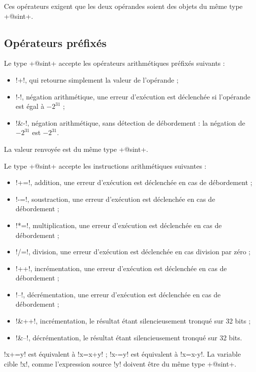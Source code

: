Ces opérateurs exigent que les deux opérandes soient des objets du même type \ggs+@sint+. 

\subsection{Opérateurs préfixés}
Le type \ggs+@sint+ accepte les opérateurs arithmétiques préfixés suivants :
\begin{itemize}
  \item \ggs!+!, qui retourne simplement la valeur de l'opérande ;
  \item \ggs!-!, négation arithmétique, une erreur d'exécution est déclenchée si l'opérande est égal à $-2^{31}$ ;
  \item \ggs!&-!, négation arithmétique, sans détection de débordement : la négation de $-2^{31}$ est $-2^{31}$.
\end{itemize}

La valeur renvoyée est du même type  \ggs+@sint+.



Le type \ggs+@sint+ accepte les instructions arithmétiques suivantes :
\begin{itemize}
  \item \ggs!+=!, addition, une erreur d'exécution est déclenchée en cas de débordement ;
  \item \ggs!-=!, soustraction, une erreur d'exécution est déclenchée en cas de débordement ;
  \item \ggs!*=!, multiplication, une erreur d'exécution est déclenchée en cas de débordement ;
  \item \ggs!/=!, division, une erreur d'exécution est déclenchée en cas division par zéro ;
  \item \ggs!++!, incrémentation, une erreur d'exécution est déclenchée en cas de débordement ;
  \item \ggs!--!, décrémentation, une erreur d'exécution est déclenchée en cas de débordement ;
  \item \ggs!&++!, incrémentation, le résultat étant silencieusement tronqué sur 32 bits ;
  \item \ggs!&--!, décrémentation, le résultat étant silencieusement tronqué sur 32 bits.
\end{itemize}

\ggs!x+=y! est équivalent à \ggs!x=x+y! ; \ggs!x-=y! est équivalent à \ggs!x=x-y!.
La variable cible \ggs!x!, comme l'expression source \ggs!y! doivent être du même type \ggs+@sint+. 

